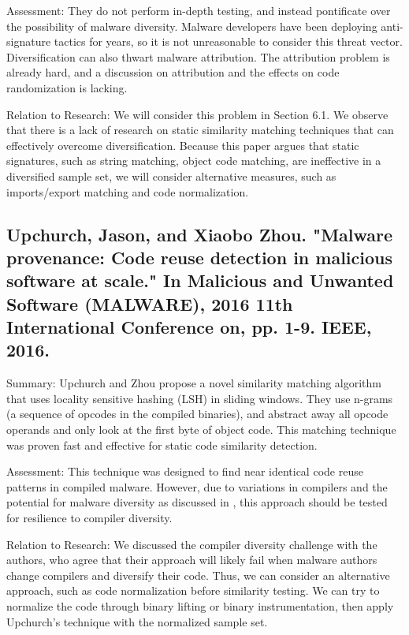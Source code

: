 \documentclass[preprint,12pt]{elsarticle}
\begin{document}
Assessment: They do not perform in-depth testing, and instead pontificate over the possibility of malware diversity. Malware developers have been deploying anti-signature tactics for years, so it is not unreasonable to consider this threat vector. Diversification can also thwart malware attribution. The attribution problem is already hard, and a discussion on attribution and the effects on code randomization is lacking.

Relation to Research: We will consider this problem in Section 6.1. We observe that there is a lack of research on static similarity matching techniques that can effectively overcome diversification. Because this paper argues that static signatures, such as string matching, object code matching, are ineffective in a diversified sample set, we will consider alternative measures, such as imports/export matching and code normalization.

\subsection{
\cite{upchurch2016malware} Upchurch, Jason, and Xiaobo Zhou. "Malware provenance: Code reuse detection in malicious software at scale." In Malicious and Unwanted Software (MALWARE), 2016 11th International Conference on, pp. 1-9. IEEE, 2016.
}

Summary: Upchurch and Zhou propose a novel similarity matching algorithm that uses locality sensitive hashing (LSH) in sliding windows. They use n-grams (a sequence of opcodes in the compiled binaries), and abstract away all opcode operands and only look at the first byte of object code. This matching technique was proven fast and effective for static code similarity detection.

Assessment: This technique was designed to find near identical code reuse patterns in compiled malware. However, due to variations in compilers and the potential for malware diversity as discussed in \cite{payer2014embracing}, this approach should be tested for resilience to compiler diversity. 

Relation to Research: We discussed the compiler diversity challenge with the authors, who agree that their approach will likely fail when malware authors change compilers and diversify their code. Thus, we can consider an alternative approach, such as code normalization before similarity testing. We can try to normalize the code through binary lifting or binary instrumentation, then apply Upchurch's technique with the normalized sample set.
\end{document}
